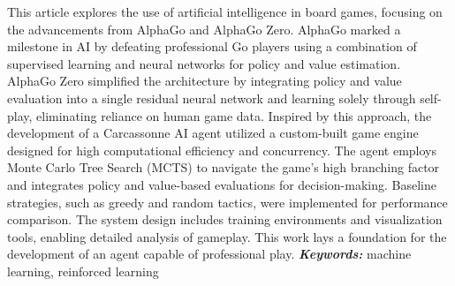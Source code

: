 This article explores the use of artificial intelligence in board games, focusing
on the advancements from AlphaGo\cite{AlphaGoAlgorithm} and AlphaGo Zero\cite{AlphaGoZero}. 
AlphaGo marked a milestone in AI by defeating professional Go players using a 
combination of supervised learning and neural networks for policy and value estimation. 
AlphaGo Zero simplified the architecture by integrating policy and value evaluation 
into a single residual neural network and learning solely through self-play, 
eliminating reliance on human game data. Inspired by this approach, the development 
of a Carcassonne AI agent utilized a custom-built game engine designed for 
high computational efficiency and concurrency. The agent employs Monte Carlo Tree Search (MCTS) 
to navigate the game’s high branching factor and integrates policy and value-based 
evaluations for decision-making. Baseline strategies, such as greedy and random tactics, 
were implemented for performance comparison. The system design includes training 
environments and visualization tools, enabling detailed analysis of gameplay. 
This work lays a foundation for the development of an agent capable of professional play.
\small
\textbf{\textit{Keywords:}} machine learning, reinforced learning
